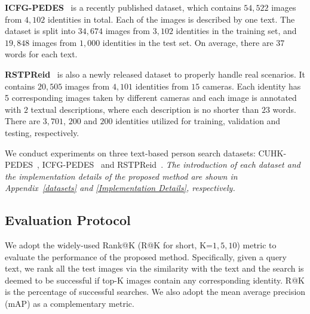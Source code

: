 \documentclass{article}
\begin{document}
\noindent\textbf{ICFG-PEDES}~\cite{ding2021semantically} is a recently published dataset, which contains $54,522$ images from $4,102$ identities in total. Each of the images is described by one text. The dataset is split into $34,674$ images from $3,102$ identities in the training set, and $19,848$ images from $1,000$ identities in the test set. On average, there are $37$ words for each text.

\noindent\textbf{RSTPReid}~\cite{zhu2021dssl} is also a newly released dataset to properly handle real scenarios. It contains $20,505$ images from $4,101$ identities from $15$ cameras. Each identity has 5 corresponding images taken by different cameras and each image is annotated with $2$ textual descriptions, where each description is no shorter than $23$ words. There are $3,701$, $200$ and $200$ identities utilized for training, validation and testing, respectively.
\fi

We conduct experiments on three text-based person search datasets: CUHK-PEDES~\cite{li2017person}, ICFG-PEDES~\cite{ding2021semantically} and RSTPReid~\cite{zhu2021dssl}.
\emph{The introduction of each dataset and the implementation details of the proposed method are shown in Appendix~\ref{datasets} and \ref{Implementation Details}, respectively.}

\subsection{Evaluation Protocol}
We adopt the widely-used Rank@K (R@K for short, K=$1,5,10$) metric to evaluate the performance of the proposed method. 
Specifically, given a query text, we rank all the test images via the similarity with the text and the search is deemed to be successful if top-K images contain any corresponding identity. R@K is the percentage of successful searches. 
We also adopt the mean average precision (mAP) as a complementary metric.
\end{document}
